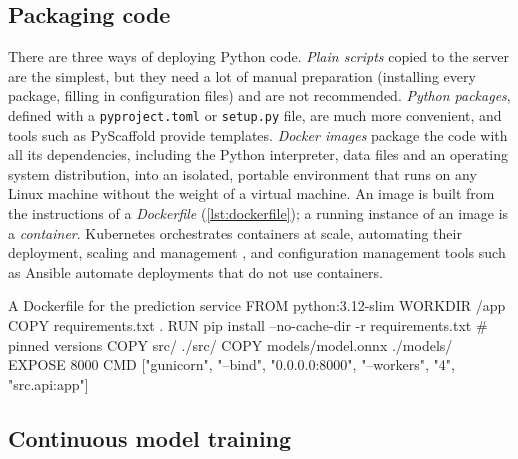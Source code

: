 \subsection{Packaging code}\label{sec:packaging}

There are three ways of deploying Python code. \emph{Plain scripts} copied to the server are the simplest,
but they need a lot of manual preparation (installing every package, filling in configuration files) and
are not recommended. \emph{Python packages}, defined with a \texttt{pyproject.toml} or \texttt{setup.py}
file, are much more convenient, and tools such as PyScaffold provide templates. \emph{Docker images}
\citep{merkel2014docker} package the code with all its dependencies, including the Python interpreter, data
files and an operating system distribution, into an isolated, portable environment that runs on any Linux
machine without the weight of a virtual machine. An image is built from the instructions of a
\emph{Dockerfile} (\cref{lst:dockerfile}); a running instance of an image is a \emph{container}.
Kubernetes orchestrates containers at scale, automating their deployment, scaling and management
\citep{burns2016borg}, and configuration management tools such as Ansible automate deployments that do not
use containers.

\begin{pylisting}[label={lst:dockerfile},listing options={style=outstyle}]{A Dockerfile for the prediction service}
FROM python:3.12-slim
WORKDIR /app
COPY requirements.txt .
RUN pip install --no-cache-dir -r requirements.txt   # pinned versions
COPY src/ ./src/
COPY models/model.onnx ./models/
EXPOSE 8000
CMD ["gunicorn", "--bind", "0.0.0.0:8000", "--workers", "4", "src.api:app"]
\end{pylisting}

\subsection{Continuous model training}

